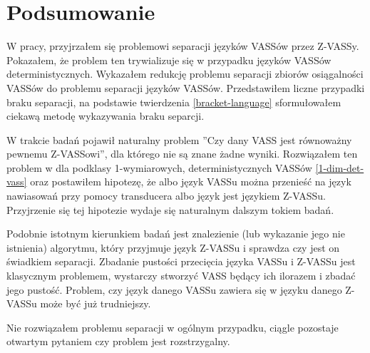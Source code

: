 

    \chapter{Podsumowanie}
    W pracy, przyjrzałem się problemowi separacji języków VASSów przez Z-VASSy.
    Pokazałem, że problem ten trywializuje  się w przypadku języków VASSów deterministycznych.
    Wykazałem redukcję problemu separacji zbiorów osiągalności VASSów \cite{reach_sep_jerome} do problemu separacji języków VASSów.
    Przedstawiłem liczne przypadki braku separacji, na podstawie twierdzenia \ref{bracket-language}
    sformułowałem ciekawą metodę wykazywania braku separcji.

    W trakcie badań pojawił naturalny problem ''Czy dany VASS jest równoważny pewnemu Z-VASSowi'', dla którego nie są znane
    żadne wyniki.
    Rozwiązałem ten problem w dla podklasy 1-wymiarowych, deterministycznych VASSów \ref{1-dim-det-vass} oraz postawiłem hipotezę,
    że albo język VASSu można przenieść na język nawiasowań przy pomocy transducera albo język jest językiem Z-VASSu.
    Przyjrzenie się tej hipotezie wydaje się naturalnym dalszym tokiem badań.

    Podobnie istotnym kierunkiem badań jest znalezienie (lub wykazanie jego nie istnienia) algorytmu, który przyjmuje
    język Z-VASSu i sprawdza czy jest on świadkiem separacji.
    Zbadanie pustości przecięcia języka VASSu i Z-VASSu jest klasycznym problemem, wystarczy stworzyć VASS będący ich ilorazem i zbadać jego pustość.
    Problem, czy język danego VASSu zawiera się w języku danego Z-VASSu może być już trudniejszy.

    Nie rozwiązałem problemu separacji w ogólnym przypadku, ciągle pozostaje otwartym pytaniem czy problem jest rozstrzygalny.


